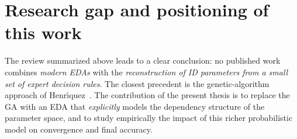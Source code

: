 \section{Research gap and positioning of this work}

The review summarized above leads to a clear conclusion:
no published work combines \emph{modern EDAs} with the
\emph{reconstruction of ID parameters from a small set of expert
decision rules}. The closest precedent is the genetic-algorithm
approach of Henr{\'\i}quez~\cite{henriquez2024tfm}. The contribution
of the present thesis is to replace the GA with an EDA that
\emph{explicitly} models the dependency structure of the parameter
space, and to study empirically the impact of this richer
probabilistic model on convergence and final accuracy.
